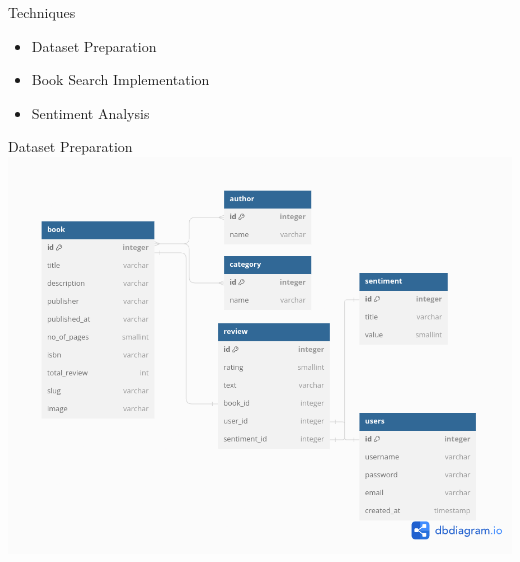 \documentclass[a4paper]{article}
\begin{document}
	\begin{frame}{Techniques}
		\begin{itemize}
			\item Dataset Preparation
				\vspace{0.5cm}
			\item Book Search Implementation
				\vspace{0.5cm}
			\item Sentiment Analysis
		\end{itemize}
	\end{frame}
	
\begin{frame}{Dataset Preparation}
	\includegraphics[width=\textwidth]{schema.png}
\end{frame}
	
\end{document}
